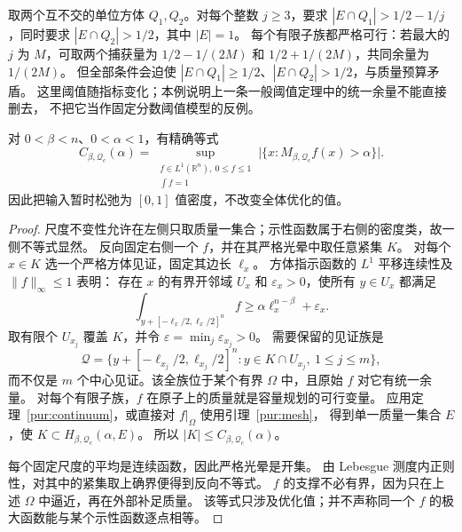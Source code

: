 \begin{example}[有限严格可行不能替代统一余量]\label{pur:margin-obstruction}
取两个互不交的单位方体 $Q_1,Q_2$。对每个整数 $j\ge3$，要求
$|E\cap Q_1|>1/2-1/j$，同时要求 $|E\cap Q_2|>1/2$，其中 $|E|=1$。
每个有限子族都严格可行：若最大的 $j$ 为 $M$，可取两个捕获量为
$1/2-1/(2M)$ 和 $1/2+1/(2M)$，共同余量为 $1/(2M)$。
但全部条件会迫使 $|E\cap Q_1|\ge1/2$、$|E\cap Q_2|>1/2$，与质量预算矛盾。
这里阈值随指标变化；本例说明上一条一般阈值定理中的统一余量不能直接删去，
不把它当作固定分数阈值模型的反例。
\end{example}

\begin{corollary}[全体常数的松弛密度表述]\label{pur:relaxation}
对 $0<\beta<n$、$0<\alpha<1$，有精确等式
\begin{equation}\label{pur:sup-equality}
 C_{\beta,\mathcal Q_c}(\alpha)
 =\sup_{\substack{f\in L^1(\mathbb R^n),\ 0\le f\le1\\\int f=1}}
 \bigl|\{x:M_{\beta,\mathcal Q_c}f(x)>\alpha\}\bigr|.
\end{equation}
因此把输入暂时松弛为 $[0,1]$ 值密度，不改变全体优化的值。
\end{corollary}
\begin{proof}
尺度不变性允许在左侧只取质量一集合；示性函数属于右侧的密度类，故一侧不等式显然。
反向固定右侧一个 $f$，并在其严格光晕中取任意紧集 $K$。
对每个 $x\in K$ 选一个严格方体见证，固定其边长 $\ell_x$。
方体指示函数的 $L^1$ 平移连续性及 $\|f\|_\infty\le1$ 表明：
存在 $x$ 的有界开邻域 $U_x$ 和 $\varepsilon_x>0$，使所有 $y\in U_x$ 都满足
\[
 \int_{y+[-\ell_x/2,\ell_x/2]^n}f
 \ge\alpha\ell_x^{n-\beta}+\varepsilon_x.
\]
取有限个 $U_{x_j}$ 覆盖 $K$，并令 $\varepsilon=\min_j\varepsilon_{x_j}>0$。
需要保留的见证族是
\[
 \mathscr Q=\{y+[-\ell_{x_j}/2,\ell_{x_j}/2]^n:
 y\in K\cap U_{x_j},\ 1\le j\le m\},
\]
而不仅是 $m$ 个中心见证。该全族位于某个有界 $\Omega$ 中，且原始 $f$ 对它有统一余量。
对每个有限子族，$f$ 在原子上的质量就是容量规划的可行变量。
应用定理~\ref{pur:continuum}，或直接对 $f|_\Omega$ 使用引理~\ref{pur:mesh}，
得到单一质量一集合 $E$，使 $K\subset H_{\beta,\mathcal Q_c}(\alpha,E)$。
所以 $|K|\le C_{\beta,\mathcal Q_c}(\alpha)$。

每个固定尺度的平均是连续函数，因此严格光晕是开集。
由 Lebesgue 测度内正则性，对其中的紧集取上确界便得到反向不等式。
$f$ 的支撑不必有界，因为只在上述 $\Omega$ 中逼近，再在外部补足质量。
该等式只涉及优化值；并不声称同一个 $f$ 的极大函数能与某个示性函数逐点相等。
\end{proof}

